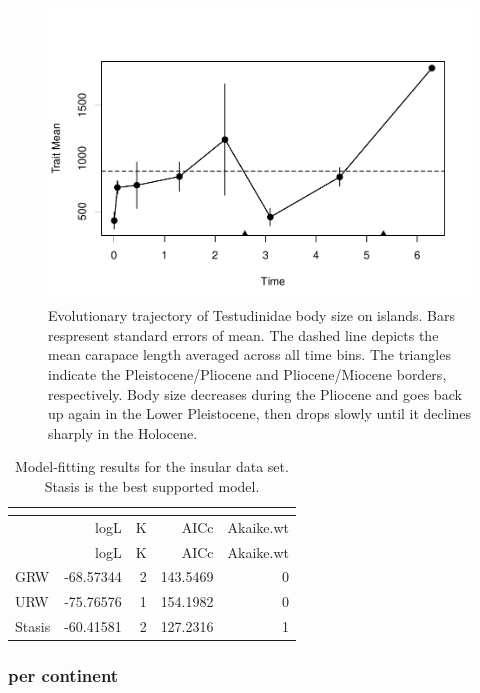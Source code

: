\begin{figure}[H]
	\centering
	\includegraphics{MA_JJ_files/figure-latex/paleoTSI-1.pdf}
	\caption[PaleoTS plot of insular data set]{Evolutionary trajectory of Testudinidae body size on islands. Bars respresent standard errors of mean. The dashed line depicts the mean carapace length averaged across all time bins. The triangles indicate the Pleistocene/Pliocene and Pliocene/Miocene borders, respectively. Body size decreases during the Pliocene and goes back up again in the Lower Pleistocene, then drops slowly until it declines sharply in the Holocene.}
	\label{fig:pTSI}
\end{figure}

\begin{longtable}[]{@{}lrrrr@{}}
	\caption[Model fits for insular data set]{Model-fitting results for the insular data set. Stasis is the best supported model.
	}
	\label{tab:pTSIEM}\tabularnewline
	\toprule
	& logL & K & AICc & Akaike.wt\tabularnewline
	\midrule
	\endfirsthead
	\toprule
	& logL & K & AICc & Akaike.wt\tabularnewline
	\midrule
	\endhead
	GRW & -68.57344 & 2 & 143.5469 & 0\tabularnewline
	URW & -75.76576 & 1 & 154.1982 & 0\tabularnewline
	Stasis & -60.41581 & 2 & 127.2316 & 1\tabularnewline
	\bottomrule
\end{longtable}

\FloatBarrier

\subsubsection{per continent}\label{per-continent}


